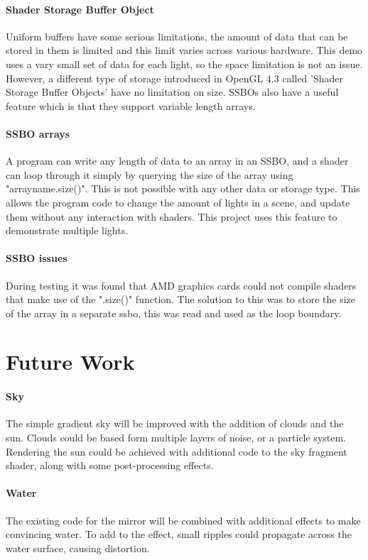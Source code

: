\documentclass[conference]{acmsiggraph}
\begin{document}
\paragraph{Shader Storage Buffer Object}
Uniform buffers have some serious limitations, the amount of data that can be stored in them is limited and this limit varies across various hardware. This demo uses a vary small set of data for each light, so the space limitation is not an issue. However, a different type of storage introduced in OpenGL 4.3 called 'Shader Storage Buffer Objects' have no limitation on size. SSBOs also have a useful feature which is that they support variable length arrays.

\paragraph{SSBO arrays}
A program can write any length of data to an array in an SSBO, and a shader can loop through it simply by querying the size of the array using "arrayname.size()". This is not possible with any other data or storage type. This allows the program code to change the amount of lights in a scene, and update them without any interaction with shaders. This project uses this feature to demonstrate multiple lights.

\paragraph{SSBO issues}
During testing it was found that AMD graphics cards could not compile shaders that make use of the ".size()" function. The solution to this was to store the size of the array in a separate ssbo, this was read and used as the loop boundary.

\section{Future Work}

\paragraph{Sky}
The simple gradient sky will be improved with the addition of clouds and the sun. Clouds could be based form multiple layers of noise, or a particle system. Rendering the sun could be achieved with additional code to the sky fragment shader, along with some post-processing effects.

\paragraph{Water}
The existing code for the mirror will be combined with additional effects to make convincing water. To add to the effect, small ripples could propagate across the water surface, causing distortion.
\end{document}
